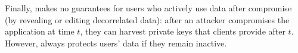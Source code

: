 Finally, \sys makes no guarantees for users who actively use \xxed data after
compromise (\eg by revealing or editing decorrelated data): after an attacker
compromises the application at time $t$, they can harvest private keys that
clients provide after $t$.
%
However, \sys always protects users' \xxed data if they remain inactive.
%
%
%
%

%
%

%

%



